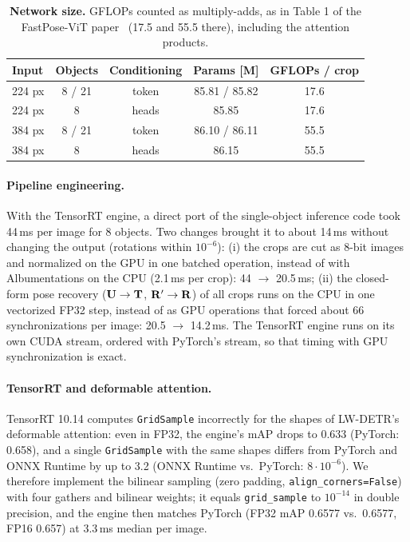 \begin{table}[h]
  \centering
  \footnotesize
  \begin{tabular}{lcccc}
    \toprule
    Input & Objects & Conditioning & Params [M] & GFLOPs / crop \\
    \midrule
    224 px & 8 / 21 & token & 85.81 / 85.82 & 17.6 \\
    224 px & 8 & heads & 85.85 & 17.6 \\
    384 px & 8 / 21 & token & 86.10 / 86.11 & 55.5 \\
    384 px & 8 & heads & 86.15 & 55.5 \\
    \bottomrule
  \end{tabular}
  \caption{\textbf{Network size.} GFLOPs counted as multiply-adds, as in Table 1 of the
  FastPose-ViT paper~\cite{ancey2026fastposevit} (17.5 and 55.5 there), including the attention
  products.}
  \label{tab:supp:size}
\end{table}

\paragraph{Pipeline engineering.}
With the TensorRT engine, a direct port of the single-object inference code took 44\,ms per image
for 8 objects. Two changes brought it to about 14\,ms without changing the output (rotations
within $10^{-6}$): (i) the crops are cut as 8-bit images and normalized on the GPU in one batched
operation, instead of with Albumentations on the CPU (2.1\,ms per crop): 44 $\rightarrow$
20.5\,ms; (ii) the closed-form pose recovery ($\mathbf{U} \rightarrow \mathbf{T}$, $\mathbf{R}' \rightarrow \mathbf{R}$) of all
crops runs on the CPU in one vectorized FP32 step, instead of as GPU operations that forced about
66 synchronizations per image: 20.5 $\rightarrow$ 14.2\,ms. The TensorRT engine runs on
its own CUDA stream, ordered with PyTorch's stream, so that timing with GPU synchronization is
exact.

\paragraph{TensorRT and deformable attention.}
TensorRT 10.14 computes \texttt{GridSample} incorrectly for the shapes of LW-DETR's deformable
attention: even in FP32, the engine's mAP drops to 0.633 (PyTorch: 0.658), and a single
\texttt{GridSample} with the same shapes differs from PyTorch and ONNX Runtime by up to 3.2 (ONNX
Runtime vs.\ PyTorch: $8 \cdot 10^{-6}$). We therefore implement the bilinear sampling (zero
padding, \texttt{align\_corners=False}) with four gathers and bilinear weights; it equals
\texttt{grid\_sample} to $10^{-14}$ in double precision, and the engine then matches PyTorch (FP32
mAP 0.6577 vs.\ 0.6577, FP16 0.657) at 3.3\,ms median per image.

